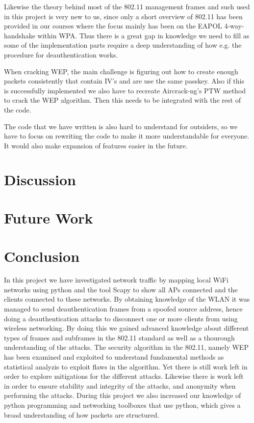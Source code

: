 Likewise the theory behind most of the 802.11 management frames and such used in this project is very new to us, since only a short overview of 802.11 has been provided in our courses where the focus mainly has been on the EAPOL 4-way-handshake within WPA. Thus there is a great gap in knowledge we need to fill as some of the implementation parts require a deep understanding of how e.g. the procedure for deauthentication works.

When cracking WEP, the main challenge is figuring out how to create enough packets consistently that contain IV's and are use the same passkey. Also if this is successfully implemented we also have to recreate Aircrack-ng's PTW method to crack the WEP algorithm. Then this needs to be integrated with the rest of the code. 

The code that we have written is also hard to understand for outsiders, so we have to focus on rewriting the code to make it more understandable for everyone. It would also make expansion of features easier in the future. 
\newpage

\section{Discussion}

\section{Future Work}

\section{Conclusion}
In this project we have investigated network traffic by mapping local WiFi networks using python and the tool Scapy to show all APs connected and the clients connected to these networks. By obtaining knowledge of the WLAN it was managed to send deauthentication frames from a spoofed source address, hence doing a deauthentication attacks to disconnect one or more clients from using wireless networking. By doing this we gained advanced knowledge about different types of frames and subframes in the 802.11 standard as well as a thourough understanding of the attacks. The security algorithm in the 802.11, namely WEP has been examined and exploited to understand fundamental methods as statistical analyzis to exploit flaws in the algorithm. Yet there is still work left in order to explore mitigations for the different attacks. Likewise there is work left in order to ensure stability and integrity of the attacks, and anonymity when performing the attacks.  
During this project we also increased our knowledge of python programming and networking toolboxes that use python, which gives a broad understanding of how packets are structured. 



